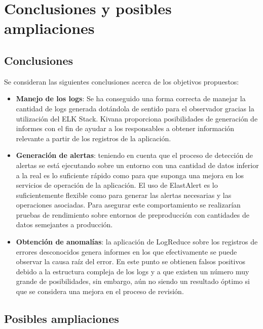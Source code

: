\chapter{Conclusiones y posibles ampliaciones}

\section{Conclusiones}

Se consideran las siguientes conclusiones acerca de los objetivos propuestos:

\begin{itemize}

\item \textbf{Manejo de los logs}: Se ha conseguido una forma correcta de manejar la cantidad de logs generada dotándola de sentido para el observador gracias la utilización del ELK Stack. Kivana proporciona posibilidades de generación de informes con el fin de ayudar a los responsables a obtener información relevante a partir de los registros de la aplicación.

\item \textbf{Generación de alertas}: teniendo en cuenta que el proceso de detección de alertas se está ejecutando sobre un entorno con una cantidad de datos inferior a la real es lo suficiente rápido como para que suponga una mejora en los servicios de operación de la aplicación. El uso de ElastAlert es lo suficientemente flexible como para generar las alertas necesarias y las operaciones asociadas.
Para asegurar este comportamiento se realizarían pruebas de rendimiento sobre entornos de preproducción con cantidades de datos semejantes a producción.

\item \textbf{Obtención de anomalías}: la aplicación de LogReduce sobre los registros de errores desconocidos genera informes en los que efectivamente se puede observar la causa raíz del error. En este punto se obtienen falsos positivos debido a la estructura compleja de los logs y a que existen un número muy grande de posibilidades, sin embargo, aún no siendo un resultado óptimo si que se considera una mejora en el proceso de revisión.

\end{itemize}


\section{Posibles ampliaciones}

